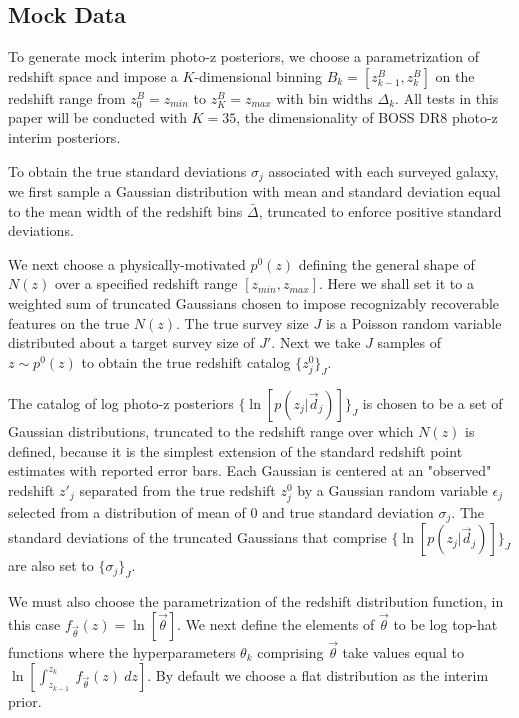 \documentclass[preprint]{aastex}
\begin{document}
\subsection{Mock Data}
\label{sec:mock}

To generate mock interim photo-z posteriors, we choose a parametrization of 
redshift space and impose a $K$-dimensional binning 
$B_{k}=[z^{B}_{k-1},z^{B}_{k}]$ on the redshift range from $z^{B}_{0}=z_{min}$ 
to $z^{B}_{K}=z_{max}$ with bin widths $\Delta_{k}$.  All tests in this paper 
will be conducted with $K=35$, the dimensionality of BOSS DR8 photo-z interim 
posteriors.  

To obtain the true standard deviations $\sigma_{j}$ associated with each 
surveyed galaxy, we first sample a Gaussian distribution with mean and standard 
deviation equal to the mean width of the redshift bins $\bar{\Delta}$, 
truncated to enforce positive standard deviations.

We next choose a physically-motivated $p^{0}(z)$ defining the general shape of 
$N(z)$ over a specified redshift range $[z_{min},z_{max}]$.  Here we shall set 
it to a weighted sum of truncated Gaussians chosen to impose recognizably 
recoverable features on the true $N(z)$.  The true survey size $J$ is a Poisson 
random variable distributed about a target survey size of $J'$.  Next we take 
$J$ samples of $z\sim p^{0}(z)$ to obtain the true redshift catalog 
$\{z^{0}_{j}\}_{J}$.  

The catalog of log photo-z posteriors $\{\ln[p(z_{j}|\vec{d}_{j})]\}_{J}$ is 
chosen to be a set of Gaussian distributions, truncated to the redshift range 
over which $N(z)$ is defined, because it is the simplest extension of the 
standard redshift point estimates with reported error bars.  Each Gaussian is 
centered at an "observed" redshift $z'_{j}$ separated from the true redshift 
$z^{0}_{j}$ by a Gaussian random variable $\epsilon_{j}$ selected from a 
distribution of mean of 0 and true standard deviation $\sigma_{j}$.  The 
standard deviations of the truncated Gaussians that comprise 
$\{\ln[p(z_{j}|\vec{d}_{j})]\}_{J}$ are also set to $\{\sigma_{j}\}_{J}$.

We must also choose the parametrization of the redshift distribution function, 
in this case $f_{\vec{\theta}}(z)=\ln[\vec{\theta}]$.  We next define the 
elements of $\vec{\theta}$ to be log top-hat functions where the 
hyperparameters $\theta_{k}$ comprising $\vec{\theta}$ take values equal to 
$\ln[\int_{z_{k-1}}^{z_{k}}\ f_{\vec{\theta}}(z)\ dz]$.  By default we choose a 
flat distribution as the interim prior.
\end{document}
